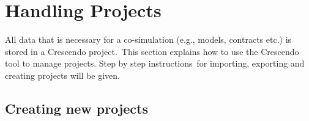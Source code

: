 \documentclass{crescendorepchap}
\begin{document}







\section{Handling Projects}

All data that is necessary for a co-simulation (e.g., models, contracts
etc.) is stored in a Crescendo project.~This section explains how to use
the Crescendo tool to manage projects. Step by step instructions~for
importing, exporting and creating projects will be given.

\subsection{Creating new projects}
\end{document}
